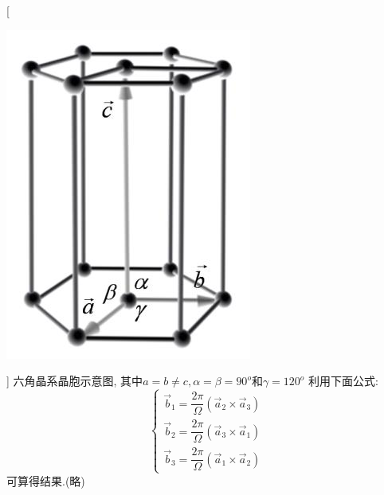 \documentclass[UTF8,10pt, a4paper, oneside]{ctexart}
\begin{document}
        [\begin{center}
            \includegraphics{picture/3-5.png}
        \end{center}]
       {六角晶系晶胞示意图, 其中$a=b\ne c ,\alpha=\beta=90^o$和$\gamma=120^o$
        利用下面公式:
        \begin{equation}
            \left\{\begin{array}{l}
            \vec{b}_{1}=\dfrac{2 \pi}{\Omega}\left(\vec{a}_{2} \times \vec{a}_{3}\right) \\
            \vec{b}_{2}=\dfrac{2 \pi}{\Omega}\left(\vec{a}_{3} \times \vec{a}_{1}\right)  \\
            \vec{b}_{3}=\dfrac{2 \pi}{\Omega}\left(\vec{a}_{1} \times \vec{a}_{2}\right)
            \end{array}\right.
            \tag{3.5.1} \label{351}
        \end{equation}
        可算得结果.(略)}
\end{document}
